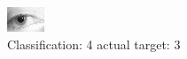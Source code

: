 \begin{figure}[h!]
\begin{center}
\includegraphics[width=0.60\columnwidth]{figures/ID1390_class_4_target_3.png}
\end{center}
\caption{ Classification: 4 actual target: 3}
\label{fig:ID1390_class_4_target_3}
\end{figure}
